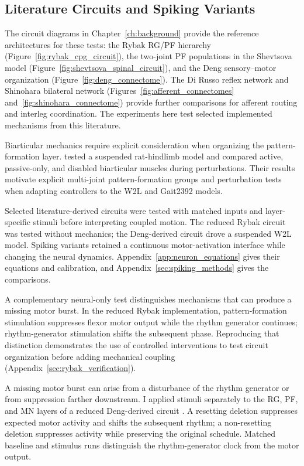 \FloatBarrier

\subsection{Literature Circuits and Spiking Variants}\label{sec:sns_literature_methods}\label{sec:sns_literature_results}\label{sec:layer_stimulus_main}

The circuit diagrams in Chapter~\ref{ch:background} provide the reference architectures for these tests: the Rybak RG/PF hierarchy (Figure~\ref{fig:rybak_cpg_circuit}), the two-joint PF populations in the Shevtsova model (Figure~\ref{fig:shevtsova_spinal_circuit}), and the Deng sensory--motor organization (Figure~\ref{fig:deng_connectome}). The Di Russo reflex network and Shinohara bilateral network (Figures~\ref{fig:afferent_connectomes} and~\ref{fig:shinohara_connectome}) provide further comparisons for afferent routing and interleg coordination. The experiments here test selected implemented mechanisms from this literature.

Biarticular mechanics require explicit consideration when organizing the pattern-formation layer. \citet{deng_biarticular_2023} tested a suspended rat-hindlimb model and compared active, passive-only, and disabled biarticular muscles during perturbations. Their results motivate explicit multi-joint pattern-formation groups and perturbation tests when adapting controllers to the W2L and Gait2392 models.

Selected literature-derived circuits were tested with matched inputs and layer-specific stimuli before interpreting coupled motion. The reduced Rybak circuit was tested without mechanics; the Deng-derived circuit drove a suspended W2L model. Spiking variants retained a continuous motor-activation interface while changing the neural dynamics. Appendix~\ref{app:neuron_equations} gives their equations and calibration, and Appendix~\ref{sec:spiking_methods} gives the comparisons.

A complementary neural-only test distinguishes mechanisms that can produce a missing motor burst. In the reduced Rybak implementation, pattern-formation stimulation suppresses flexor motor output while the rhythm generator continues; rhythm-generator stimulation shifts the subsequent phase. Reproducing that distinction demonstrates the use of controlled interventions to test circuit organization before adding mechanical coupling (Appendix~\ref{sec:rybak_verification}).

A missing motor burst can arise from a disturbance of the rhythm generator or from suppression farther downstream. I applied stimuli separately to the RG, PF, and MN layers of a reduced Deng-derived circuit \citep{deng_neuromechanical_2019,nourse_sns_2023}. A resetting deletion suppresses expected motor activity and shifts the subsequent rhythm; a non-resetting deletion suppresses activity while preserving the original schedule. Matched baseline and stimulus runs distinguish the rhythm-generator clock from the motor output.

